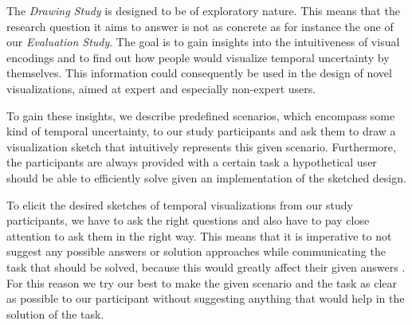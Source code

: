 The \textit{Drawing Study} is designed to be of exploratory nature. This means that the research question it aims to answer is not as concrete as for instance the one of our \textit{Evaluation Study}. The goal is to gain insights into the intuitiveness of visual encodings and to find out how people would visualize temporal uncertainty by themselves. This information could consequently be used in the design of novel visualizations, aimed at expert and especially non-expert users. \par \medskip

To gain these insights, we describe predefined scenarios, which encompass some kind of temporal uncertainty, to our study participants and ask them to draw a visualization sketch that intuitively represents this given scenario. Furthermore, the participants are always provided with a certain task a hypothetical user should be able to efficiently solve given an implementation of the sketched design. \par \medskip

To elicit the desired sketches of temporal visualizations from our study participants, we have to ask the right questions and also have to pay close attention to ask them in the right way. This means that it is imperative to not suggest any possible answers or solution approaches while communicating the task that should be solved, because this would greatly affect their given answers \cite{hullman2016evaluating}. For this reason we try our best to make the given scenario and the task as clear as possible to our participant without suggesting anything that would help in the solution of the task. \par \medskip

